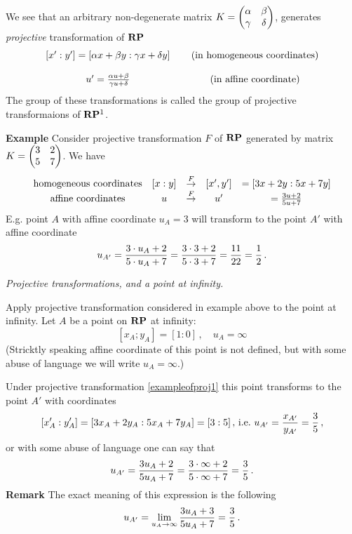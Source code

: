 \documentclass[12pt]{article}
\numberwithin{equation}{section}
\begin{document}
   We see that   an arbitrary non-degenerate matrix
  $K=\begin{pmatrix}\alpha &\beta\cr \gamma &\delta\end{pmatrix}$,
generates 
   {\it projective} transformation of ${\bf R}{\bf P}$
            \begin{equation*}
            \begin{matrix}
            [x':y']=[\alpha x+\beta y:\gamma x+\delta y]\,\quad
      &(\hbox{in homogeneous coordinates})\cr
       {} & {}\cr
            u'={\alpha u+\beta \over \gamma u+\delta }\,\quad
      &(\hbox{in affine coordinate})\cr
                \end{matrix}
             \end{equation*}
The group of these transformations is called the 
group of projective transformaions of ${\bf R}{\bf P}^1$.




\m

{\bf Example}  Consider projective transformation $F$ of ${\bf R}{\bf P}$
generated by matrix $K=\begin{pmatrix}3 & 2\cr 5 & 7\cr\end{pmatrix}$.
   We have 
              \begin{equation}\label{exampleofproj1}
                       \begin{matrix}
     \hbox {homogeneous coordinates} &[x:y]&{\buildrel F\over \rightarrow} 
                                &[x',y']&=[3x+2y:5x+7y]\cr 
     \hbox {affine coordinates}  &u&{\buildrel F\over \rightarrow} 
                                &u'&={3u+2\over 5u+7}\cr
                 \end{matrix} 
                 \end{equation} 
E.g. point $A$ with affine coordinate $u_A=3$ will transform to the point
 $A'$ with affine coordinate 
              $$
    u_{A'}={3\cdot u_A+2\over 5\cdot u_A+7}
     ={3\cdot 3+2\over 5\cdot 3+7}=
{11\over 22}={1\over 2}\,.
        $$

\centerline {\it Projective transformations, and a point at infinity.}

Apply projective transformation
considered in example above to the point
at infinity.
     Let $A$ be a point on ${\bf R}{\bf P}$ 
at infinity: 
        $$
  [x_A;y_A]=[1:0]\,,\quad u_A=\infty
           $$
  (Stricktly speaking affine coordinate of this 
point is not defined, 
but with some abuse of language we will write $u_A=\infty$.)

Under projective transformation
 \eqref{exampleofproj1} this point transforms 
to the point  $A'$ with coordinates
                       $$
         [x_A':y_A']=[3x_A+2y_A:5x_A+7y_A]=[3:5]\,, \,
\hbox {i.e.}\,\,
u_{A'}=
{x_{A'}\over y_{A'}}={3\over 5}\,,
                       $$
or with some abuse of language one can say that
                       $$
             u_{A'}=
          {3u_A+2\over 5u_A+7}=
          {3\cdot \infty+2\over 5\cdot\infty+7}={3\over 5}\,.
   $$
{\bf Remark} The exact meaning of this expression is the following
          \begin{equation}\label{continuityargument2}
        u_{A'}=\lim_{u_A\to \infty} 
          {3u_A+3\over 5u_A+7}={3\over 5}\,.
          \end{equation}
\end{document}
